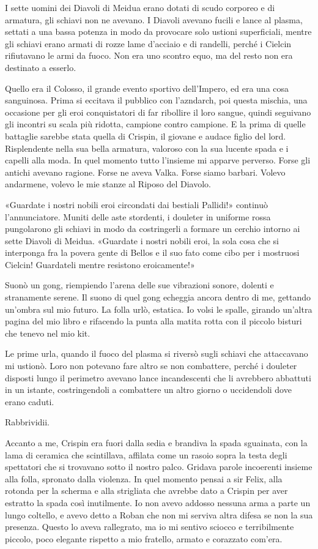 I sette uomini dei Diavoli di Meidua erano dotati di scudo corporeo e di
armatura, gli schiavi non ne avevano. I Diavoli avevano fucili e lance
al plasma, settati a una bassa potenza in modo da provocare solo ustioni
superficiali, mentre gli schiavi erano armati di rozze lame d'acciaio e
di randelli, perché i Cielcin rifiutavano le armi da fuoco. Non era uno
scontro equo, ma del resto non era destinato a esserlo.

Quello era il Colosso, il grande evento sportivo dell'Impero, ed era una
cosa sanguinosa. Prima si eccitava il pubblico con l'azndarch, poi
questa mischia, una occasione per gli eroi conquistatori di far
ribollire il loro sangue, quindi seguivano gli incontri su scala più
ridotta, campione contro campione. E la prima di quelle battaglie
sarebbe stata quella di Crispin, il giovane e audace figlio del lord.
Risplendente nella sua bella armatura, valoroso con la sua lucente spada
e i capelli alla moda. In quel momento tutto l'insieme mi apparve
perverso. Forse gli antichi avevano ragione. Forse ne {aveva} Valka.
Forse siamo barbari. Volevo andarmene, volevo le mie stanze al Riposo
del Diavolo.

«Guardate i nostri nobili eroi circondati dai bestiali Pallidi!»
continuò l'annunciatore. Muniti delle aste stordenti, i douleter in
uniforme rossa pungolarono gli schiavi in modo da costringerli a formare
un cerchio intorno ai sette Diavoli di Meidua. «Guardate i nostri nobili
eroi, la sola cosa che si interponga fra la povera gente di Bellos e il
suo fato come cibo per i mostruosi Cielcin! Guardateli mentre resistono
eroicamente!»

Suonò un gong, riempiendo l'arena delle sue vibrazioni sonore, dolenti e
stranamente serene. Il suono di quel gong echeggia ancora dentro di me,
gettando un'ombra sul mio futuro. La folla urlò, estatica. Io volsi le
spalle, girando un'altra pagina del mio libro e rifacendo la punta alla
matita rotta con il piccolo bisturi che tenevo nel mio kit.

Le prime urla, quando il fuoco del plasma si riversò sugli schiavi che
attaccavano mi ustionò. Loro non potevano fare altro se non combattere,
perché i douleter disposti lungo il perimetro avevano lance
incandescenti che li avrebbero abbattuti in un istante, costringendoli a
combattere un altro giorno o uccidendoli dove erano caduti.

Rabbrividii.

Accanto a me, Crispin era fuori dalla sedia e brandiva la spada
sguainata, con la lama di ceramica che scintillava, affilata come un
rasoio sopra la testa degli spettatori che si trovavano sotto il nostro
palco. Gridava parole incoerenti insieme alla folla, spronato dalla
violenza. In quel momento pensai a sir Felix, alla rotonda per la
scherma e alla strigliata che avrebbe dato a Crispin per aver estratto
la spada così inutilmente. Io non avevo addosso nessuna arma a parte un
lungo coltello, e avevo detto a Roban che non mi serviva altra difesa se
non la sua presenza. Questo lo aveva rallegrato, ma io mi sentivo
sciocco e terribilmente piccolo, poco elegante rispetto a mio fratello,
armato e corazzato com'era.

